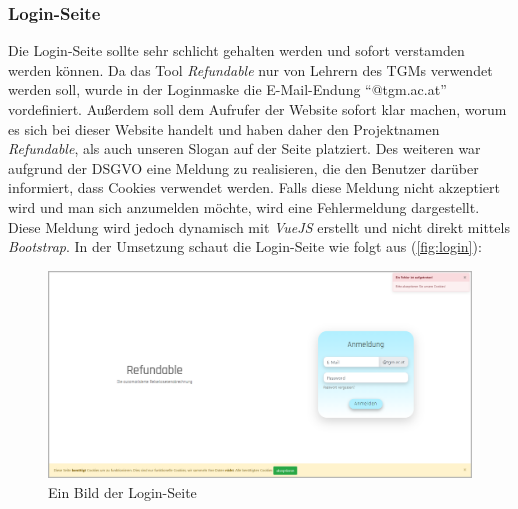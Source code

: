 \subsubsection{Login-Seite}
\label{chapter:implementierung-frontend-komponenten-login}
Die Login-Seite sollte sehr schlicht gehalten werden und sofort verstamden werden können. Da das Tool \textit{Refundable} nur von Lehrern des TGMs verwendet werden soll, wurde in der Loginmaske die E-Mail-Endung \enquote{@tgm.ac.at} vordefiniert. Außerdem soll dem Aufrufer der Website sofort klar machen, worum es sich bei dieser Website handelt und haben daher den Projektnamen \textit{Refundable}, als auch unseren Slogan auf der Seite platziert. Des weiteren war aufgrund der DSGVO eine Meldung zu realisieren, die den Benutzer darüber informiert, dass Cookies verwendet werden. Falls diese Meldung nicht akzeptiert wird und man sich anzumelden möchte, wird eine Fehlermeldung dargestellt. Diese Meldung wird jedoch dynamisch mit \textit{VueJS} erstellt und nicht direkt mittels \textit{Bootstrap}. In der Umsetzung schaut die Login-Seite wie folgt aus (\autoref{fig:login}):
\begin{figure}[H]
	\centering
	\includegraphics[width=1\linewidth]{images/ldehner_implementierung/login}
	\caption[Login Seite]{Ein Bild der Login-Seite}
	\label{fig:login}
\end{figure}
